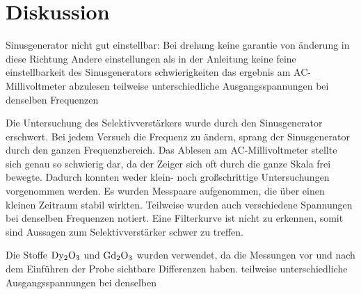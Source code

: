 \section{Diskussion}
\label{sec:Diskussion}
Sinusgenerator nicht gut einstellbar: Bei drehung keine garantie von änderung in diese Richtung
Andere einstellungen als in der Anleitung
keine feine einstellbarkeit des Sinusgenerators
schwierigkeiten das ergebnis am AC-Millivoltmeter abzulesen
teilweise unterschiedliche Ausgangsspannungen bei denselben Frequenzen

Die Untersuchung des Selektivverstärkers wurde durch den Sinusgenerator erschwert.
Bei jedem Versuch die Frequenz zu ändern, sprang der Sinusgenerator durch den ganzen Frequenzbereich.
Das Ablesen am AC-Millivoltmeter stellte sich genau so schwierig dar, da der Zeiger sich oft durch die ganze Skala frei bewegte.
Dadurch konnten weder klein- noch großschrittige Untersuchungen vorgenommen werden.
Es wurden Messpaare aufgenommen, die über einen kleinen Zeitraum stabil wirkten.
Teilweise wurden auch verschiedene Spannungen bei denselben Frequenzen notiert.
Eine Filterkurve ist nicht zu erkennen, somit sind Aussagen zum Selektivverstärker schwer zu treffen.

Die Stoffe $\ce{Dy2O3}$ und $\ce{Gd2O3}$ wurden verwendet, da die Messungen vor und nach dem Einführen der Probe sichtbare Differenzen haben.
teilweise unterschiedliche Ausgangsspannungen bei denselben 
